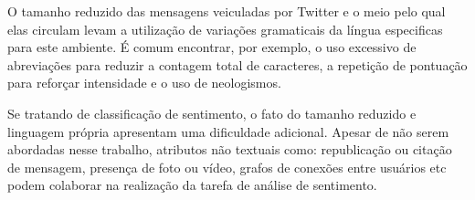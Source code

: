 O tamanho reduzido das mensagens veiculadas por Twitter e o meio pelo qual elas circulam levam a utilização de
variações gramaticais da língua especificas para este ambiente.
É comum encontrar, por exemplo, o uso excessivo de abreviações para reduzir a contagem total de caracteres, a repetição
de pontuação para reforçar intensidade e o uso de neologismos.

Se tratando de classificação de sentimento, o fato do tamanho reduzido e linguagem própria apresentam uma dificuldade
adicional.
Apesar de não serem abordadas nesse trabalho, atributos não textuais como: republicação ou citação de mensagem, presença
de foto ou vídeo, grafos de conexões entre usuários etc podem colaborar na realização da tarefa de análise de sentimento.
